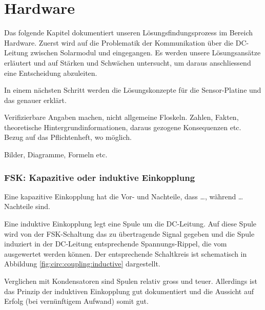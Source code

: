 \chapter{Hardware}
\label{chap:hardware}

Das folgende Kapitel dokumentiert  unseren L\"osungsfindungsprozess im Bereich
Hardware. Zuerst  wird  auf  die  Problematik  der  Kommunikation  \"uber  die
DC-Leitung  zwischen  Solarmodul  und \Master  eingegangen. Es  werden  unsere
L\"osungsans\"atze erl\"autert  und auf St\"arken und  Schw\"achen untersucht,
um daraus anschliessend eine Entscheidung abzuleiten.

In   einem  n\"achsten   Schritt  werden   die  L\"osungskonzepte   f\"ur  die
Sensor-Platine und das \Master genauer erkl\"art.

\anweisung Verifizierbare  Angaben machen, nicht  allgemeine Floskeln. Zahlen,
Fakten,  theoretische Hintergrundinformationen,  daraus gezogene  Konsequenzen
etc. Bezug auf das Pflichtenheft, wo m\"oglich.

\anweisung Bilder, Diagramme, Formeln etc.



\subsection{FSK: Kapazitive oder induktive Einkopplung}
\label{subsec:hw:fsk:kapaVsInduk}

Eine kapazitive Einkopplung hat die Vor- und Nachteile, dass \ldots, w\"ahrend
\ldots Nachteile sind.


Eine induktive Einkopplung legt eine  Spule um die DC-Leitung. Auf diese Spule
wird von der FSK-Schaltung das zu  \"ubertragende Signal gegeben und die Spule
induziert in  der DC-Leitung  entsprechende Spannungs-Rippel, die  vom \Master
ausgewertet werden k\"onnen. Der entsprechende  Schaltkreis ist schematisch in
Abbildung \ref{fig:circ:coupling:inductive} dargestellt.

Verglichen mit  Kondensatoren sind Spulen relativ  gross und teuer. Allerdings
ist das Prinzip  der induktiven Einkopplung gut dokumentiert  und die Aussicht
auf Erfolg (bei vern\"unftigem Aufwand) somit gut.

